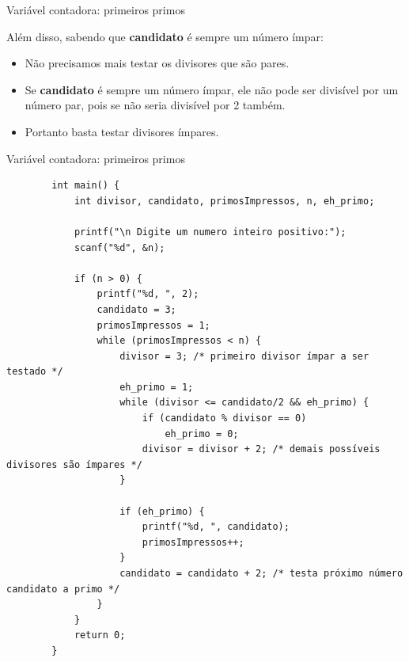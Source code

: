 \documentclass[handout]{beamer}
\begin{document}
\begin{frame}[fragile]{Variável contadora: primeiros primos}

    Além disso, sabendo que {\bf candidato} é sempre um número ímpar:
    \begin{itemize}
        \item Não precisamos mais testar os divisores que são pares.
        \item Se {\bf candidato} é sempre um número ímpar, ele não pode ser divisível por um número par, pois se não seria divisível por 2 também.
        \item Portanto basta testar divisores ímpares.
    \end{itemize}
\end{frame}

\begin{frame}[fragile]{Variável contadora: primeiros primos}
    
    \begin{verbatim}
        int main() {
            int divisor, candidato, primosImpressos, n, eh_primo;

            printf("\n Digite um numero inteiro positivo:");
            scanf("%d", &n);

            if (n > 0) {
                printf("%d, ", 2);
                candidato = 3;
                primosImpressos = 1;
                while (primosImpressos < n) {
                    divisor = 3; /* primeiro divisor ímpar a ser testado */
                    eh_primo = 1;
                    while (divisor <= candidato/2 && eh_primo) {
                        if (candidato % divisor == 0)
                            eh_primo = 0;
                        divisor = divisor + 2; /* demais possíveis divisores são ímpares */
                    }

                    if (eh_primo) {
                        printf("%d, ", candidato);
                        primosImpressos++;
                    }
                    candidato = candidato + 2; /* testa próximo número candidato a primo */
                }
            }
            return 0;
        }
    \end{verbatim}
\end{frame}
\end{document}

